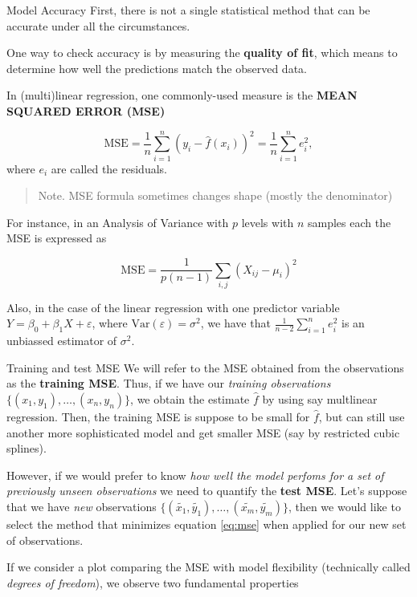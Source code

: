 \documentclass[
  ignorenonframetext,
]{beamer}
\begin{document}
\begin{frame}{Model Accuracy}
\label{model-accuracy}
First, there is not a single statistical method that can be accurate
under all the circumstances.

One way to check accuracy is by measuring the \textbf{quality of fit},
which means to determine how well the predictions match the observed
data.

In (multi)linear regression, one commonly-used measure is the
\textbf{MEAN SQUARED ERROR (MSE)}

\[
\mathrm{MSE}= \frac{1}{n}\sum_{i=1}^n (y_i -\hat{f}(x_i))^2 = \frac{1}{n} \sum_{i=1}^n e_i^2,
\] where \(e_i\) are called the residuals.

\begin{quote}
Note. MSE formula sometimes changes shape (mostly the denominator)
\end{quote}

For instance, in an Analysis of Variance with \(p\) levels with \(n\)
samples each the MSE is expressed as

\[
\mathrm{MSE}= \frac{1}{p(n-1)} \sum_{i,j}(X_{ij}-\mu_i)^2
\]

Also, in the case of the linear regression with one predictor variable
\(Y=\beta_0+ \beta_1 X + \varepsilon\), where
\(\mathrm{Var}(\varepsilon)=\sigma^2\), we have that
\(\frac{1}{n-2} \sum_{i=1}^n e_i^2\) is an unbiassed estimator of
\(\sigma^2\).

\begin{block}{Training and test MSE}
\label{training-and-test-mse}
We will refer to the MSE obtained from the observations as the
\textbf{training MSE}. Thus, if we have our \emph{training observations}
\(\{ (x_1,y_1),\ldots,(x_n,y_n) \}\), we obtain the estimate \(\hat{f}\)
by using say multlinear regression. Then, the training MSE is suppose to
be small for \(\hat{f}\), but can still use another more sophisticated
model and get smaller MSE (say by restricted cubic splines).

However, if we would prefer to know \emph{how well the model perfoms for
a set of previously unseen observations} we need to quantify the
\textbf{test MSE}. Let's suppose that we have \emph{new} observations
\(\{ (\tilde{x_1},\tilde{y_1}),\ldots,(\tilde{x_m},\tilde{y_m})\}\),
then we would like to select the method that minimizes equation
\ref{eq:mse} when applied for our new set of observations.

If we consider a plot comparing the MSE with model flexibility
(technically called \emph{degrees of freedom}), we observe two
fundamental properties


\end{block}
\end{frame}
\end{document}
